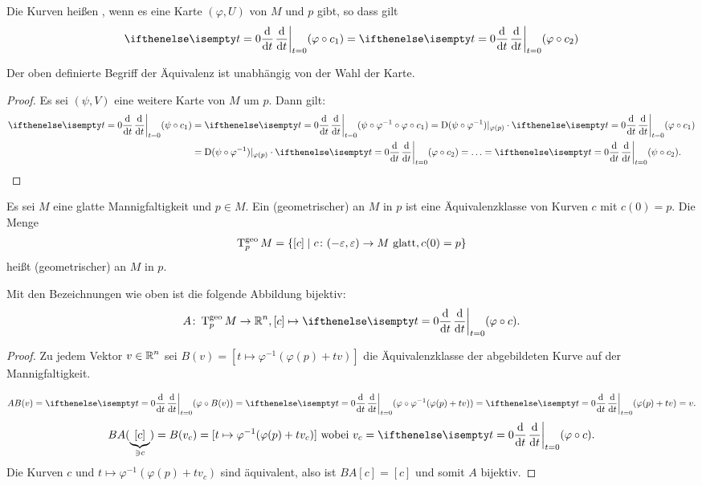 Die Kurven heißen , wenn es eine Karte $(\varphi,U)$ von $M$ und $p$ gibt, so dass gilt
\begin{align*}
  \difffrac[t=0]{}{t}(\varphi \circ c_1) = \difffrac[t=0]{}{t}(\varphi \circ c_2)
\end{align*}

\begin{Lemma}
  Der oben definierte Begriff der Äquivalenz ist unabhängig von der Wahl der Karte.
\end{Lemma}

\begin{proof}
  Es sei $(\psi,V)$ eine weitere Karte von $M$ um $p$. Dann gilt:
  \begin{align*}
    \difffrac[t=0]{}{t}(\psi\circ c_1) & = \difffrac[t=0]{}{t}(\psi\circ\varphi^{-1}\circ\varphi \circ c_1) = \D (\psi \circ \varphi^{-1})|_{\varphi(p)} \cdot \difffrac[t=0]{}{t}(\varphi \circ c_1)\\
    & = \D(\psi \circ \varphi^{-1})|_{\varphi(p)} \cdot \difffrac[t=0]{}{t}(\varphi \circ c_2) = \ldots = \difffrac[t=0]{}{t}(\psi \circ c_2).
  \end{align*}
\end{proof}

\begin{Dfn}
  Es sei $M$ eine glatte Mannigfaltigkeit und $p \in M$. Ein (geometrischer)  an $M$ in $p$ ist eine Äquivalenzklasse von Kurven $c$ mit $c(0) = p$. Die Menge
  \begin{align*}
    \operatorname{T}_{p}^{\text{geo}}M = \{ [c] \mid c \colon (-\varepsilon,\varepsilon) \to M \text{ glatt}, c(0) = p\}
  \end{align*}
  heißt (geometrischer)  an $M$ in $p$.
\end{Dfn}

\begin{Bem}
  Mit den Bezeichnungen wie oben ist die folgende Abbildung bijektiv:
  \begin{align*}
    A \colon \T_p^{\text{geo}}M \to \R^n, [c] \mapsto \difffrac[t=0]{}{t}(\varphi \circ c).
  \end{align*}
\end{Bem}

\begin{proof}
  Zu jedem Vektor $v \in \operatorname{\mathbb{R}}^n$ sei $B(v) = [t \mapsto \varphi^{-1}(\varphi(p) + tv)]$ die Äquivalenzklasse der abgebildeten Kurve auf der Mannigfaltigkeit.


  \[ A B(v) = \difffrac[t=0]{}{t}(\varphi \circ B(v)) = \difffrac[t=0]{}{t}(\varphi \circ \varphi^{-1}(\varphi(p) + tv)) = \difffrac[t=0]{}{t}(\varphi(p) + tv) = v. \]
  \[ B A (\underbrace{[c]}_{\ni c}) = B(v_c) = [t \mapsto \varphi^{-1}(\varphi(p) + tv_c)] \text{ wobei } v_c = \difffrac[t=0]{}{t}(\varphi \circ c). \]
  Die Kurven $c$ und $t \mapsto \varphi^{-1}(\varphi(p) + tv_c)$ sind äquivalent, also ist $B A[c] = [c]$ und somit $A$ bijektiv.
\end{proof}

